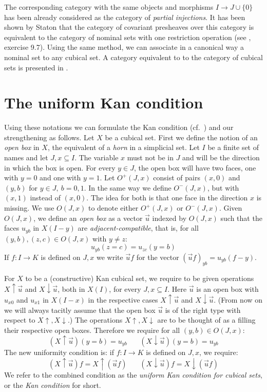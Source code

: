\documentclass[10pt,a4paper]{article}
\newcommand{\rup}[1]{#1{\uparrow}}
\newcommand{\rdo}[1]{#1{\downarrow}}
\begin{document}
\medskip

 The corresponding category with the same objects and morphisms $I \to J\cup\{0\}$ has been already
considered as the category of {\em partial injections}. It has been shown by Staton that the category of covariant
presheaves over this category is equivalent to the category of nominal sets with one restriction operation
(see \cite{pitts}, exercise 9.7). Using the same method, we can associate in a canonical way a nominal set
to any cubical set. A category equivalent to to the category of cubical sets is presented in \cite{Pitts}.

\section{The uniform Kan condition}

 Using these notations we can formulate the Kan condition (cf.\ \cite{Kan})
and our strengthening as follows. Let $X$ be a cubical set.
First we define the notion of an \emph{open box} in $X$, the equivalent of a \emph{horn} in a simplicial set.
Let $I$ be a finite set of names and let $J,x \subseteq I$.
The variable $x$ must not be in $J$ and will be the direction in which the box is open.
For every $y\in J$, the open box will have two faces, one with $y=0$ and one with $y=1$.
Let $O^+(J,x)$ consist of pairs $(x,0)$ and $(y,b)$ for $y\in J,~b=0,1$.
In the same way we define $O^-(J,x)$, but with $(x,1)$ instead of $(x,0)$.
The idea for both is that one face in the direction $x$ is missing.
We use $O(J,x)$ to denote either $O^+(J,x)$ or $O^-(J,x)$.
Given $O(J,x)$, we define an \emph{open box} as a vector $\vec u$ indexed by $O(J,x)$
such that the faces $u_{yb}$ in $X(I-y)$ are \emph{adjacent-compatible},
that is, for all $(y,b),(z,c)\in O(J,x)$ with $y\neq z$:
$$u_{yb}(z = c) = u_{zc}(y = b)$$
If $f:I\to K$ is defined on $J,x$ we write
$\vec u f$ for the vector $(\vec u f)_{yb} = u_{yb} (f-y)$.

 For $X$ to be a (constructive) Kan cubical set, we require to be given operations
$\rup{X} \vec u$ and $\rdo{X} \vec u$, both in $X(I)$, for every $J,x\subseteq I$.
Here $\vec u$ is an open box with $u_{x0}$ and $u_{x1}$ in $X(I-x)$ in the
respective cases $\rup{X} \vec u$ and $\rdo{X} \vec u$. (From now on we will always
tacitly assume that the open box $\vec u$ is of the right type with respect to $\rup{X},\rdo{X}$.)
The operations $\rup{X},\rdo{X}$ are to be thought of as a filling their
respective open boxes. Therefore we require for all $(y,b)\in O(J,x)$:
$$
(\rup{X} \vec u) (y=b) = u_{yb}~~~~~~~~(\rdo{X} \vec u) (y=b) = u_{yb}
$$
The new uniformity condition is: if $f:I\to K$ is defined on $J,x$, we require:
$$
(\rup{X} \vec u) f = \rup{X} (\vec{u}f)~~~~~~~~(\rdo{X} \vec u) f = \rdo{X} (\vec{u}f)
$$
We refer to the combined condition as the \emph{uniform Kan condition for cubical sets},
or the \emph{Kan condition} for short. %
\end{document}
